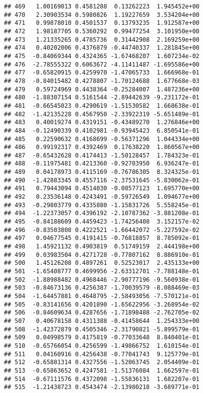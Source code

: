 \documentclass[
]{article}
\begin{document}
\begin{verbatim}
## 469   1.00169013 0.4581288  0.13262223  1.945452e+00
## 470   2.30903534 0.5980826  1.19227659  3.534204e+00
## 471   0.99878010 0.4501537  0.13793235  1.912587e+00
## 472   1.98187705 0.5360292  0.99477254  3.101950e+00
## 473   1.21335265 0.4785736  0.31442908  2.169259e+00
## 474   0.40202006 0.4376879 -0.44740337  1.281845e+00
## 475  -0.84069344 0.4324365 -1.67468207  1.607234e-02
## 476  -2.78555322 0.6063672 -4.11411487 -1.695586e+00
## 477  -0.65820915 0.4259970 -1.47065733  1.666968e-01
## 478  -0.84015482 0.4278807 -1.70124688  1.677668e-03
## 479   0.59724969 0.4438364 -0.25284007  1.487236e+00
## 480  -1.88307154 0.5161544 -2.89442639 -9.231172e-01
## 481  -0.66545023 0.4290619 -1.51530582  1.668638e-01
## 482  -1.42135228 0.4567950 -2.33922319 -5.651489e-01
## 483   0.40019274 0.4319151 -0.43489270  1.276846e+00
## 484  -0.12490339 0.4102981 -0.93945423  6.850541e-01
## 485   0.22590632 0.4168699 -0.56371296  1.044334e+00
## 486   0.99192317 0.4392469  0.17638220  1.860567e+00
## 487  -0.65432628 0.4174413 -1.50128457  1.784323e-01
## 488  -0.11975481 0.4213360 -0.92703950  6.936247e-01
## 489   0.04178973 0.4115169 -0.76786305  8.324325e-01
## 490  -1.42883345 0.4557116 -2.37531645 -5.830062e-01
## 491   0.79443094 0.4514030 -0.08577123  1.695770e+00
## 492   0.23536148 0.4243491 -0.59726549  1.094677e+00
## 493  -0.29803779 0.4335880 -1.15831726  5.558245e-01
## 494  -1.22373057 0.4396192 -2.10787362 -3.881208e-01
## 495  -0.84188609 0.4459423 -1.74256408  3.152157e-02
## 496  -0.83503808 0.4222521 -1.66442072 -5.227592e-02
## 497   0.04677545 0.4191415 -0.76818857  8.785092e-01
## 498   1.45921132 0.4903819  0.51749159  2.444198e+00
## 499   0.03983504 0.4271728 -0.77807162  8.886910e-01
## 500   1.45126208 0.4897261  0.52523017  2.435133e+00
## 501  -1.65408777 0.4699956 -2.63312701 -7.788148e-01
## 502  -1.88988482 0.4968446 -2.90777196 -9.560938e-01
## 503  -0.84673136 0.4256387 -1.70039579 -8.088469e-03
## 504  -1.64457881 0.4648795 -2.58493056 -7.570121e-01
## 505  -0.83141656 0.4201890 -1.65622956 -3.268954e-02
## 506  -0.84609634 0.4287656 -1.71898488 -2.762705e-02
## 507   0.40678158 0.4311388 -0.41458644  1.254333e+00
## 508  -1.42372879 0.4505346 -2.31790821 -5.899579e-01
## 509   0.04998579 0.4175819 -0.77033648  8.840401e-01
## 510  -0.65766054 0.4256599 -1.49866752  1.610154e-01
## 511   0.04160916 0.4256438 -0.77041743  9.125779e-01
## 512  -0.65881314 0.4327556 -1.52063745  2.054409e-01
## 513  -0.65863652 0.4247581 -1.51376084  1.662597e-01
## 514  -0.67111576 0.4372098 -1.55836131  1.682207e-01
## 515  -1.21438723 0.4543474 -2.13980218 -3.689771e-01

\end{verbatim}
\end{document}
